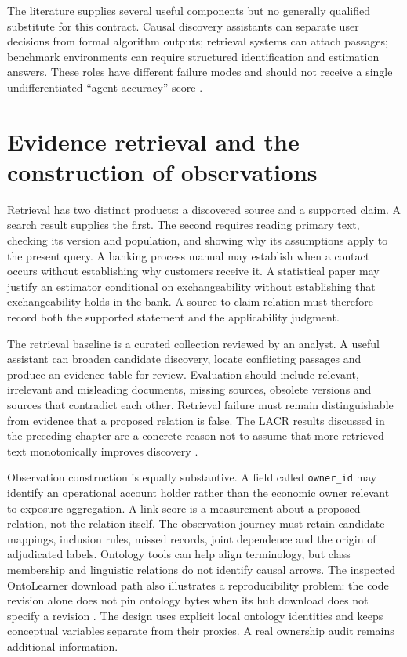 The literature supplies several useful components but no generally qualified
substitute for this contract. Causal discovery assistants can separate user
decisions from formal algorithm outputs; retrieval systems can attach passages;
benchmark environments can require structured identification and estimation
answers. These roles have different failure modes and should not receive a
single undifferentiated ``agent accuracy'' score
\cite{v12_la_2606_23608,v12_la_2402_15301,v12_la_package_causalds}.

\section{Evidence retrieval and the construction of observations}

Retrieval has two distinct products: a discovered source and a supported claim.
A search result supplies the first. The second requires reading primary text,
checking its version and population, and showing why its assumptions apply to
the present query. A banking process manual may establish when a contact occurs
without establishing why customers receive it. A statistical paper may justify
an estimator conditional on exchangeability without establishing that
exchangeability holds in the bank. A source-to-claim relation must therefore
record both the supported statement and the applicability judgment.

The retrieval baseline is a curated collection reviewed by an analyst. A useful
assistant can broaden candidate discovery, locate conflicting passages and
produce an evidence table for review. Evaluation should include relevant,
irrelevant and misleading documents, missing sources, obsolete versions and
sources that contradict each other. Retrieval failure must remain distinguishable
from evidence that a proposed relation is false. The LACR results discussed in
the preceding chapter are a concrete reason not to assume that more retrieved
text monotonically improves discovery \cite{v12_la_2402_15301}.

Observation construction is equally substantive. A field called
\texttt{owner\_id} may identify an operational account holder rather than the
economic owner relevant to exposure aggregation. A link score is a measurement
about a proposed relation, not the relation itself. The observation journey must
retain candidate mappings, inclusion rules, missed records, joint dependence
and the origin of adjudicated labels. Ontology tools can help align terminology,
but class membership and linguistic relations do not identify causal arrows.
The inspected OntoLearner download path also illustrates a reproducibility
problem: the code revision alone does not pin ontology bytes when its hub download
does not specify a revision \cite{v12_la_package_ontolearner}. The design uses
explicit local ontology identities and keeps conceptual variables separate from
their proxies. A real ownership audit remains additional information.

